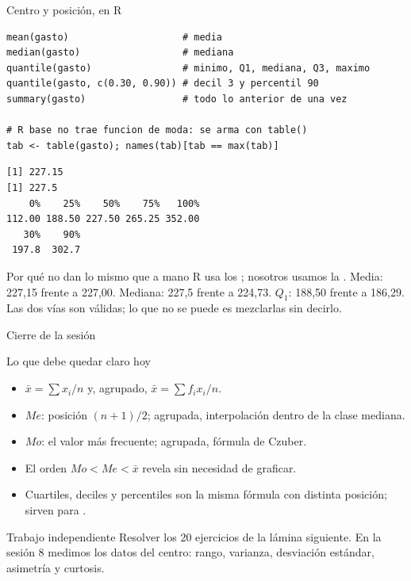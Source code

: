 \documentclass[aspectratio=169,10pt]{beamer}
\begin{document}
\begin{frame}[fragile]{Centro y posición, en R}
  \scriptsize
\begin{lstlisting}[style=Rmini]
mean(gasto)                    # media
median(gasto)                  # mediana
quantile(gasto)                # minimo, Q1, mediana, Q3, maximo
quantile(gasto, c(0.30, 0.90)) # decil 3 y percentil 90
summary(gasto)                 # todo lo anterior de una vez

# R base no trae funcion de moda: se arma con table()
tab <- table(gasto); names(tab)[tab == max(tab)]
\end{lstlisting}
\begin{lstlisting}[style=Rout]
[1] 227.15
[1] 227.5
    0%    25%    50%    75%   100%
112.00 188.50 227.50 265.25 352.00
   30%    90%
 197.8  302.7
\end{lstlisting}

  \vspace{-0.1cm}
  \begin{alertblock}{Por qué no dan lo mismo que a mano}
    \tiny
    R usa los ; nosotros usamos la
    . Media: 227,15 frente a 227,00. Mediana: 227,5
    frente a 224,73. $Q_1$: 188,50 frente a 186,29. Las dos vías son válidas;
    lo que no se puede es mezclarlas sin decirlo.
  \end{alertblock}
\end{frame}

\begin{frame}{Cierre de la sesión}
  \begin{block}{Lo que debe quedar claro hoy}
    \scriptsize
    \begin{itemize}\setlength{\itemsep}{0.02cm}
      \item $\bar{x} = \sum x_i / n$ y, agrupado, $\bar{x} = \sum f_i x_i / n$.
      \item $Me$: posición $(n+1)/2$; agrupada, interpolación dentro de la
            clase mediana.
      \item $Mo$: el valor más frecuente; agrupada, fórmula de Czuber.
      \item El orden $Mo < Me < \bar{x}$ revela  sin
            necesidad de graficar.
      \item Cuartiles, deciles y percentiles son la misma fórmula con distinta
            posición; sirven para .
    \end{itemize}
  \end{block}

  \vspace{0.1cm}
  \begin{alertblock}{Trabajo independiente}
    \scriptsize
    Resolver los 20 ejercicios de la lámina siguiente. En la sesión 8 medimos
     los datos del centro: rango, varianza,
    desviación estándar, asimetría y curtosis.
  \end{alertblock}
\end{frame}
\end{document}
